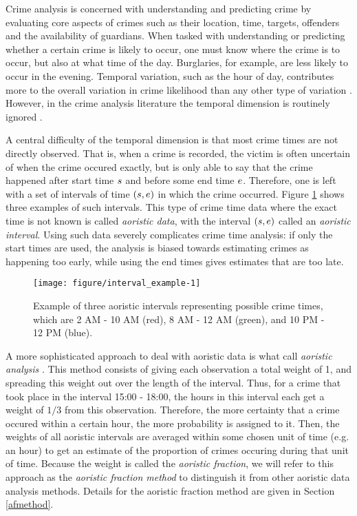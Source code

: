 
Crime analysis is concerned with understanding and predicting crime by evaluating core aspects of crimes such as their location, time, targets, offenders and the availability of guardians. When tasked with understanding or predicting whether a certain crime is likely to occur, one must know where the crime is to occur, but also at what time of the day. Burglaries, for example, are less likely to occur in the evening. Temporal variation, such as the hour of day, contributes more to the overall variation in crime likelihood than any other type of variation \citep{felson2003simple}. However, in the crime analysis literature the temporal dimension is routinely ignored \citep{ratcliffe1998aoristic, ratcliffe2000aoristic}.

A central difficulty of the temporal dimension is that most crime times are not directly observed. That is, when a crime is recorded, the victim is often uncertain of when the crime occured exactly, but is only able to say that the crime happened after start time $s$ and before some end time $e$. Therefore, one is left with a set of intervals of time $(s, e)$ in which the crime occurred. Figure \ref{exdat} shows three examples of such intervals. This type of crime time data where the exact time is not known is called \textit{aoristic data}, with the interval $(s, e)$ called an  \textit{aoristic interval}. Using such data severely complicates crime time analysis: if only the start times are used, the analysis is biased towards estimating crimes as happening too early, while using the end times gives estimates that are too late.

\begin{figure}
\centering
\begin{knitrout}
\color{fgcolor}
\texttt{[image: figure/interval\_example-1]} 

\end{knitrout}
\caption{Example of three aoristic intervals representing possible crime times, which are 2 AM - 10 AM (red), 8 AM - 12 AM (green), and 10 PM - 12 PM (blue). } \label{exdat}
\end{figure}

A more sophisticated approach to deal with aoristic data is what \citet{ashby2013comparison} call \textit{aoristic analysis} \citep{ratcliffe1998aoristic, ratcliffe2000aoristic}. This method consists of giving each observation a total weight of 1, and spreading this weight out over the length of the interval. Thus, for a crime that took place in the interval 15:00 - 18:00, the hours in this interval each get a weight of $1/3$ from this observation. Therefore, the more certainty that a crime occured within a certain hour, the more probability is assigned to it. Then, the weights of all aoristic intervals are averaged within some chosen unit of time (e.g. an hour) to get an estimate of the proportion of crimes occuring during that unit of time. Because the weight is called the \textit{aoristic fraction}, we will refer to this approach as the \textit{aoristic fraction method} to distinguish it from other aoristic data analysis methods. Details for the aoristic fraction method are given in Section \ref{afmethod}.

